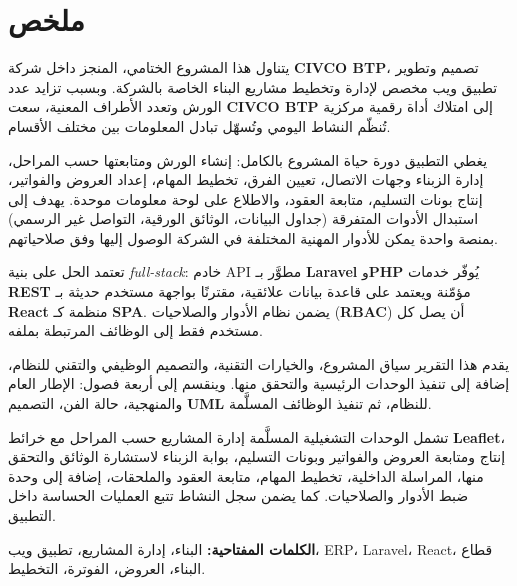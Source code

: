 \chapter*{{\arabicfont ملخص}}

\begin{arabicblock}
يتناول هذا المشروع الختامي، المنجز داخل شركة \textbf{CIVCO BTP}،
تصميم وتطوير تطبيق ويب مخصص لإدارة وتخطيط مشاريع البناء الخاصة بالشركة.
وبسبب تزايد عدد الورش وتعدد الأطراف المعنية،
سعت \textbf{CIVCO BTP} إلى امتلاك أداة رقمية مركزية
تُنظّم النشاط اليومي وتُسهّل تبادل المعلومات بين مختلف الأقسام.

\vspace{0.35cm}

يغطي التطبيق دورة حياة المشروع بالكامل: إنشاء الورش ومتابعتها حسب المراحل،
إدارة الزبناء وجهات الاتصال، تعيين الفرق، تخطيط المهام،
إعداد العروض والفواتير، إنتاج بونات التسليم،
متابعة العقود، والاطلاع على لوحة معلومات موحدة.
يهدف إلى استبدال الأدوات المتفرقة (جداول البيانات، الوثائق الورقية،
التواصل غير الرسمي) بمنصة واحدة
يمكن للأدوار المهنية المختلفة في الشركة الوصول إليها
وفق صلاحياتهم.

\vspace{0.35cm}

تعتمد الحل على بنية \textit{full-stack}:
خادم API مطوَّر بـ \textbf{Laravel} و\textbf{PHP}
يُوفّر خدمات \textbf{REST} مؤمّنة
ويعتمد على قاعدة بيانات علائقية،
مقترنًا بواجهة مستخدم حديثة بـ \textbf{React}
منظمة كـ \textbf{SPA}.
يضمن نظام الأدوار والصلاحيات (\textbf{RBAC})
أن يصل كل مستخدم فقط إلى الوظائف المرتبطة بملفه.

\vspace{0.35cm}

يقدم هذا التقرير سياق المشروع، والخيارات التقنية،
والتصميم الوظيفي والتقني للنظام،
إضافة إلى تنفيذ الوحدات الرئيسية والتحقق منها.
وينقسم إلى أربعة فصول: الإطار العام والمنهجية،
حالة الفن، التصميم \textbf{UML} للنظام،
ثم تنفيذ الوظائف المسلَّمة.

\vspace{0.35cm}

تشمل الوحدات التشغيلية المسلَّمة إدارة المشاريع حسب المراحل
مع خرائط \textbf{Leaflet}،
إنتاج ومتابعة العروض والفواتير وبونات التسليم،
بوابة الزبناء لاستشارة الوثائق والتحقق منها،
المراسلة الداخلية، تخطيط المهام،
متابعة العقود والملحقات،
إضافة إلى وحدة ضبط الأدوار والصلاحيات.
كما يضمن سجل النشاط تتبع العمليات الحساسة داخل التطبيق.

\vspace{0.5cm}
\noindent\textbf{الكلمات المفتاحية:}
البناء، إدارة المشاريع، تطبيق ويب، ERP، Laravel، React،
قطاع البناء، العروض، الفوترة، التخطيط.
\end{arabicblock}
